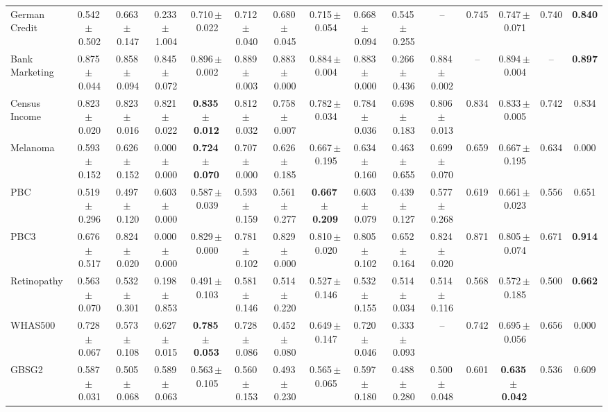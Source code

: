 \documentclass[8pt]{extarticle}
\begin{document}
\begin{longtable}{l*{14}{c}}
German Credit & 0.542\,$\pm$\,0.502 & 0.663\,$\pm$\,0.147 & 0.233\,$\pm$\,1.004 & 0.710\,$\pm$\,0.022 & 0.712\,$\pm$\,0.040 & 0.680\,$\pm$\,0.045 & 0.715\,$\pm$\,0.054 & 0.668\,$\pm$\,0.094 & 0.545\,$\pm$\,0.255 & -- & 0.745 & 0.747\,$\pm$\,0.071 & 0.740 & \textbf{0.840} \\
Bank Marketing & 0.875\,$\pm$\,0.044 & 0.858\,$\pm$\,0.094 & 0.845\,$\pm$\,0.072 & 0.896\,$\pm$\,0.002 & 0.889\,$\pm$\,0.003 & 0.883\,$\pm$\,0.000 & 0.884\,$\pm$\,0.004 & 0.883\,$\pm$\,0.000 & 0.266\,$\pm$\,0.436 & 0.884\,$\pm$\,0.002 & -- & 0.894\,$\pm$\,0.004 & -- & \textbf{0.897} \\
Census Income & 0.823\,$\pm$\,0.020 & 0.823\,$\pm$\,0.016 & 0.821\,$\pm$\,0.022 & \textbf{0.835\,$\pm$\,0.012} & 0.812\,$\pm$\,0.032 & 0.758\,$\pm$\,0.007 & 0.782\,$\pm$\,0.034 & 0.784\,$\pm$\,0.036 & 0.698\,$\pm$\,0.183 & 0.806\,$\pm$\,0.013 & 0.834 & 0.833\,$\pm$\,0.005 & 0.742 & 0.834 \\
Melanoma & 0.593\,$\pm$\,0.152 & 0.626\,$\pm$\,0.152 & 0.000\,$\pm$\,0.000 & \textbf{0.724\,$\pm$\,0.070} & 0.707\,$\pm$\,0.000 & 0.626\,$\pm$\,0.185 & 0.667\,$\pm$\,0.195 & 0.634\,$\pm$\,0.160 & 0.463\,$\pm$\,0.655 & 0.699\,$\pm$\,0.070 & 0.659 & 0.667\,$\pm$\,0.195 & 0.634 & 0.000 \\
PBC & 0.519\,$\pm$\,0.296 & 0.497\,$\pm$\,0.120 & 0.603\,$\pm$\,0.000 & 0.587\,$\pm$\,0.039 & 0.593\,$\pm$\,0.159 & 0.561\,$\pm$\,0.277 & \textbf{0.667\,$\pm$\,0.209} & 0.603\,$\pm$\,0.079 & 0.439\,$\pm$\,0.127 & 0.577\,$\pm$\,0.268 & 0.619 & 0.661\,$\pm$\,0.023 & 0.556 & 0.651 \\
PBC3 & 0.676\,$\pm$\,0.517 & 0.824\,$\pm$\,0.020 & 0.000\,$\pm$\,0.000 & 0.829\,$\pm$\,0.000 & 0.781\,$\pm$\,0.102 & 0.829\,$\pm$\,0.000 & 0.810\,$\pm$\,0.020 & 0.805\,$\pm$\,0.102 & 0.652\,$\pm$\,0.164 & 0.824\,$\pm$\,0.020 & 0.871 & 0.805\,$\pm$\,0.074 & 0.671 & \textbf{0.914} \\
Retinopathy & 0.563\,$\pm$\,0.070 & 0.532\,$\pm$\,0.301 & 0.198\,$\pm$\,0.853 & 0.491\,$\pm$\,0.103 & 0.581\,$\pm$\,0.146 & 0.514\,$\pm$\,0.220 & 0.527\,$\pm$\,0.146 & 0.532\,$\pm$\,0.155 & 0.514\,$\pm$\,0.034 & 0.514\,$\pm$\,0.116 & 0.568 & 0.572\,$\pm$\,0.185 & 0.500 & \textbf{0.662} \\
WHAS500 & 0.728\,$\pm$\,0.067 & 0.573\,$\pm$\,0.108 & 0.627\,$\pm$\,0.015 & \textbf{0.785\,$\pm$\,0.053} & 0.728\,$\pm$\,0.086 & 0.452\,$\pm$\,0.080 & 0.649\,$\pm$\,0.147 & 0.720\,$\pm$\,0.046 & 0.333\,$\pm$\,0.093 & -- & 0.742 & 0.695\,$\pm$\,0.056 & 0.656 & 0.000 \\
GBSG2 & 0.587\,$\pm$\,0.031 & 0.505\,$\pm$\,0.068 & 0.589\,$\pm$\,0.063 & 0.563\,$\pm$\,0.105 & 0.560\,$\pm$\,0.153 & 0.493\,$\pm$\,0.230 & 0.565\,$\pm$\,0.065 & 0.597\,$\pm$\,0.180 & 0.488\,$\pm$\,0.280 & 0.500\,$\pm$\,0.048 & 0.601 & \textbf{0.635\,$\pm$\,0.042} & 0.536 & 0.609 \\

\end{longtable}
\end{document}
